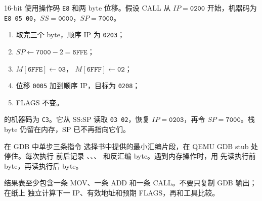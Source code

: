 \begin{center}
\end{center}


16-bit  使用操作码 \texttt{E8} 和两 byte 位移。假设 CALL
从 \(IP=\texttt{0200}\) 开始，机器码为
\texttt{E8 05 00}，\(SS=\texttt{0000}\)，\(SP=\texttt{7000}\)。

\begin{enumerate}[leftmargin=2.2em]
  \item 取完三个 byte，顺序 IP 为 \texttt{0203}；
  \item \(SP\leftarrow\texttt{7000}-2=\texttt{6FFE}\)；
  \item \(M[\texttt{6FFE}]\leftarrow\texttt{03}\)，
    \(M[\texttt{6FFF}]\leftarrow\texttt{02}\)；
  \item 位移 \texttt{0005} 加到顺序 IP，目标为 \texttt{0208}；
  \item FLAGS 不变。
\end{enumerate}

 的机器码为 \texttt{C3}。它从 SS:SP 读取
\texttt{03 02}，恢复 \(IP=\texttt{0203}\)，再令
\(SP=\texttt{7000}\)。栈 byte 仍留在内存，SP 已不再指向它们。

\begin{experimentbox}{在 GDB 中单步三条指令}
选择书中提供的最小汇编片段，在 QEMU GDB stub 处停住。每次执行
 前后记录 、、、
 和反汇编 byte。遇到内存操作时，用 
先读执行前 byte，再读执行后 byte。

结果表至少包含一条 MOV、一条 ADD 和一条 CALL。不要只复制 GDB 输出；在纸上
独立计算下一 IP、有效地址和预期 FLAGS，再和工具比较。
\end{experimentbox}

